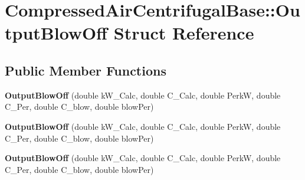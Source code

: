 \hypertarget{struct_compressed_air_centrifugal_base_1_1_output_blow_off}{}\section{Compressed\+Air\+Centrifugal\+Base\+:\+:Output\+Blow\+Off Struct Reference}
\label{struct_compressed_air_centrifugal_base_1_1_output_blow_off}
\subsection*{Public Member Functions}
\begin{DoxyCompactItemize}
\item 
\mbox{\label{struct_compressed_air_centrifugal_base_1_1_output_blow_off_abba57dd7bb7799f777317ffea6c56fe5}} 
{\bfseries Output\+Blow\+Off} (double k\+W\+\_\+\+Calc, double C\+\_\+\+Calc, double PerkW, double C\+\_\+\+Per, double C\+\_\+blow, double blow\+Per)
\item 
\mbox{\label{struct_compressed_air_centrifugal_base_1_1_output_blow_off_abba57dd7bb7799f777317ffea6c56fe5}} 
{\bfseries Output\+Blow\+Off} (double k\+W\+\_\+\+Calc, double C\+\_\+\+Calc, double PerkW, double C\+\_\+\+Per, double C\+\_\+blow, double blow\+Per)
\item 
\mbox{\label{struct_compressed_air_centrifugal_base_1_1_output_blow_off_abba57dd7bb7799f777317ffea6c56fe5}} 
{\bfseries Output\+Blow\+Off} (double k\+W\+\_\+\+Calc, double C\+\_\+\+Calc, double PerkW, double C\+\_\+\+Per, double C\+\_\+blow, double blow\+Per)
\end{DoxyCompactItemize}

